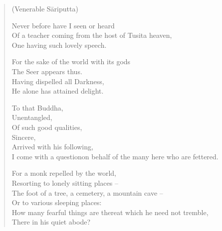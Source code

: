 
\begin{verse}

\vspace*{-0.6\baselineskip}
(Venerable S\=ariputta)
\vspace*{-0.4\baselineskip}

 Never before have I seen or heard\\
Of a teacher coming from the host of Tusita heaven,\\
One having such lovely speech.


 For the sake of the world with its gods\\
The Seer appears thus.\\
Having dispelled all Darkness,\\
He alone has attained delight.


 To that Buddha,\\
Unentangled,\\
Of such good qualities,\\
Sincere,\\
Arrived with his following,\\
I come with a question\newline on behalf of the many here who are fettered.


 For a monk repelled by the world,\\
Resorting to lonely sitting places --\\
The foot of a tree, a cemetery, a mountain cave --\\
Or to various sleeping places:\\
How many fearful things are there\newline at which he need not tremble,\\
There in his quiet abode?


\end{verse}
